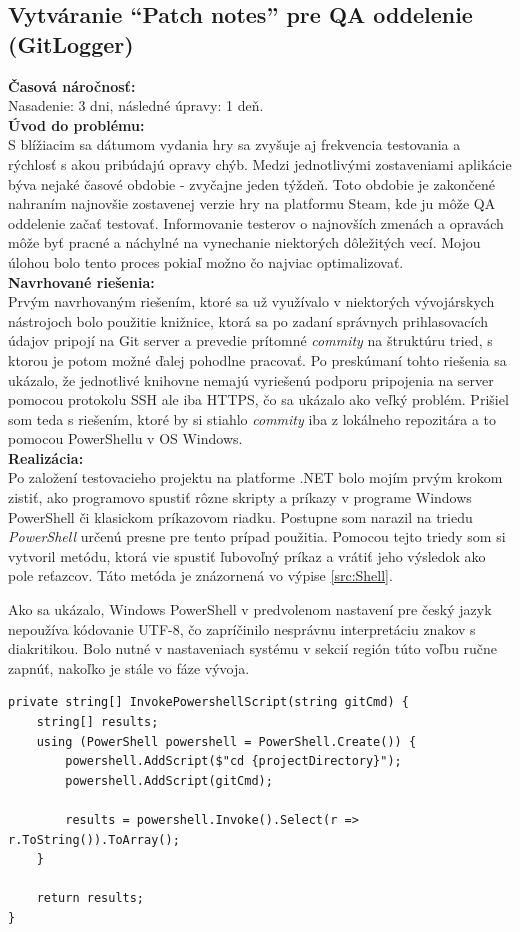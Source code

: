 \documentclass[slovak, bachelorpractice]{diploma}
\begin{document}
\subsection{Vytváranie \enquote{Patch notes} pre QA oddelenie (GitLogger)}
\label{sec:GitLogger}
\textbf{Časová náročnosť:} \\ Nasadenie: 3 dni, následné úpravy: 1 deň.\\
\textbf{Úvod do problému:} \\ S blížiacim sa dátumom vydania hry sa zvyšuje aj frekvencia testovania a rýchlosť s akou pribúdajú opravy chýb. Medzi jednotlivými zostaveniami aplikácie býva nejaké časové obdobie - zvyčajne jeden týždeň. Toto obdobie je zakončené nahraním najnovšie zostavenej verzie hry na platformu Steam, kde ju môže QA oddelenie začať testovať. Informovanie testerov o najnovších zmenách a opravách môže byť pracné a náchylné na vynechanie niektorých dôležitých vecí. Mojou úlohou bolo tento proces pokiaľ možno čo najviac optimalizovať.\\
\textbf{Navrhované riešenia:} \\ Prvým navrhovaným riešením, ktoré sa už využívalo v niektorých vývojárskych nástrojoch bolo použitie knižnice, ktorá sa po zadaní správnych prihlasovacích údajov pripojí na Git server a prevedie prítomné \textit{commity} na štruktúru tried, s ktorou je potom možné ďalej pohodlne pracovať. Po preskúmaní tohto riešenia sa ukázalo, že jednotlivé knihovne nemajú vyriešenú podporu pripojenia na server pomocou protokolu SSH ale iba HTTPS, čo sa ukázalo ako veľký problém. Prišiel som teda s riešením, ktoré by si stiahlo \textit{commity} iba z lokálneho repozitára a to pomocou PowerShellu v OS Windows.  \\
\textbf{Realizácia:} \\ Po založení testovacieho projektu na platforme .NET bolo mojím prvým krokom zistiť, ako programovo spustiť rôzne skripty a príkazy v programe Windows PowerShell či klasickom príkazovom riadku. Postupne som narazil na triedu \textit{PowerShell} určenú presne pre tento prípad použitia. Pomocou tejto triedy som si vytvoril metódu, ktorá vie spustiť ľubovoľný príkaz a vrátiť jeho výsledok ako pole reťazcov. Táto metóda je znázornená vo výpise \ref{src:Shell}. 

Ako sa ukázalo, Windows PowerShell v predvolenom nastavení pre český jazyk nepoužíva kódovanie UTF-8, čo zapríčinilo nesprávnu interpretáciu znakov s diakritikou. Bolo nutné v nastaveniach systému v sekcií región túto voľbu ručne zapnúť, nakoľko je stále vo fáze vývoja.
\vspace{10pt}
\begin{lstlisting}[label=src:Shell,caption={Metóda na spustenie skriptu v programe Powershell}]
private string[] InvokePowershellScript(string gitCmd) {
    string[] results;
    using (PowerShell powershell = PowerShell.Create()) {
        powershell.AddScript($"cd {projectDirectory}");
        powershell.AddScript(gitCmd);

        results = powershell.Invoke().Select(r => r.ToString()).ToArray();
    }

    return results;
}
\end{lstlisting}
\end{document}

